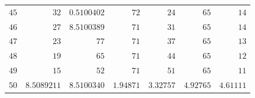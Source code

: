\begin{center}
\begin{tabular}{||r||r|r|r|r|r|r||}
\(45\) & \(32\) & \(0.5100402\) & \(72\) & \(24\) & \(65\) & \(14\)\\
\(46\) & \(27\) & \(8.5100389\) & \(71\) & \(31\) & \(65\) & \(14\)\\
\(47\) & \(23\) & \(77\) & \(71\) & \(37\) & \(65\) & \(13\)\\
\(48\) & \(19\) & \(65\) & \(71\) & \(44\) & \(65\) & \(12\)\\
\(49\) & \(15\) & \(52\) & \(71\) & \(51\) & \(65\) & \(11\)\\[3pt]
\(50\) & \(8.5089211\) & \(8.5100340\) & \(1.94871\) & \(3.32757\) & \(4.92765\) & \(4.61111\)\\
\hline\hline
\end{tabular}
\end{center}
\endgroup
\clearpage
